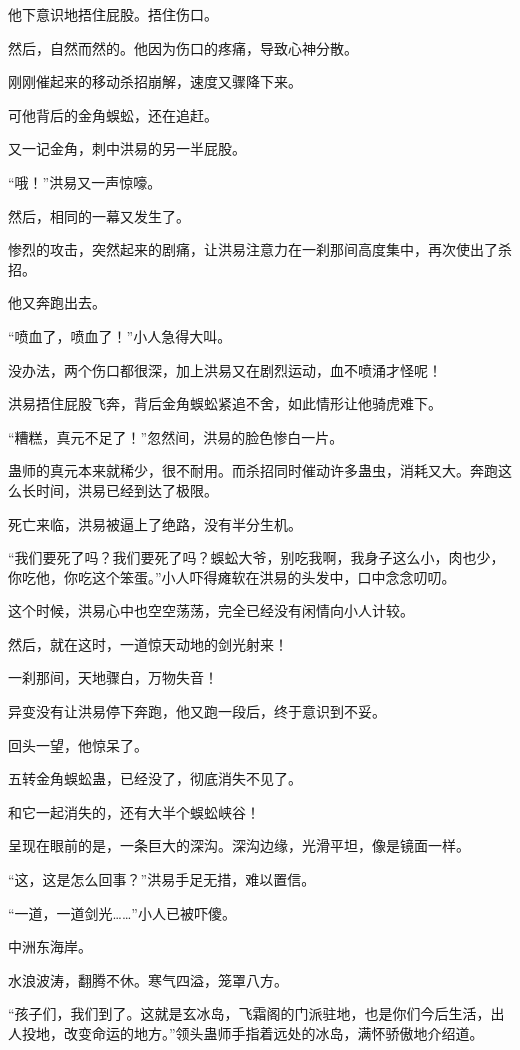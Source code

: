 \begin{this_body}
他下意识地捂住屁股。捂住伤口。

然后，自然而然的。他因为伤口的疼痛，导致心神分散。

刚刚催起来的移动杀招崩解，速度又骤降下来。

可他背后的金角蜈蚣，还在追赶。

又一记金角，刺中洪易的另一半屁股。

“哦！”洪易又一声惊嚎。

然后，相同的一幕又发生了。

惨烈的攻击，突然起来的剧痛，让洪易注意力在一刹那间高度集中，再次使出了杀招。

他又奔跑出去。

“喷血了，喷血了！”小人急得大叫。

没办法，两个伤口都很深，加上洪易又在剧烈运动，血不喷涌才怪呢！

洪易捂住屁股飞奔，背后金角蜈蚣紧追不舍，如此情形让他骑虎难下。

“糟糕，真元不足了！”忽然间，洪易的脸色惨白一片。

蛊师的真元本来就稀少，很不耐用。而杀招同时催动许多蛊虫，消耗又大。奔跑这么长时间，洪易已经到达了极限。

死亡来临，洪易被逼上了绝路，没有半分生机。

“我们要死了吗？我们要死了吗？蜈蚣大爷，别吃我啊，我身子这么小，肉也少，你吃他，你吃这个笨蛋。”小人吓得瘫软在洪易的头发中，口中念念叨叨。

这个时候，洪易心中也空空荡荡，完全已经没有闲情向小人计较。

然后，就在这时，一道惊天动地的剑光射来！

一刹那间，天地骤白，万物失音！

异变没有让洪易停下奔跑，他又跑一段后，终于意识到不妥。

回头一望，他惊呆了。

五转金角蜈蚣蛊，已经没了，彻底消失不见了。

和它一起消失的，还有大半个蜈蚣峡谷！

呈现在眼前的是，一条巨大的深沟。深沟边缘，光滑平坦，像是镜面一样。

“这，这是怎么回事？”洪易手足无措，难以置信。

“一道，一道剑光……”小人已被吓傻。

中洲东海岸。

水浪波涛，翻腾不休。寒气四溢，笼罩八方。

“孩子们，我们到了。这就是玄冰岛，飞霜阁的门派驻地，也是你们今后生活，出人投地，改变命运的地方。”领头蛊师手指着远处的冰岛，满怀骄傲地介绍道。


\end{this_body}

